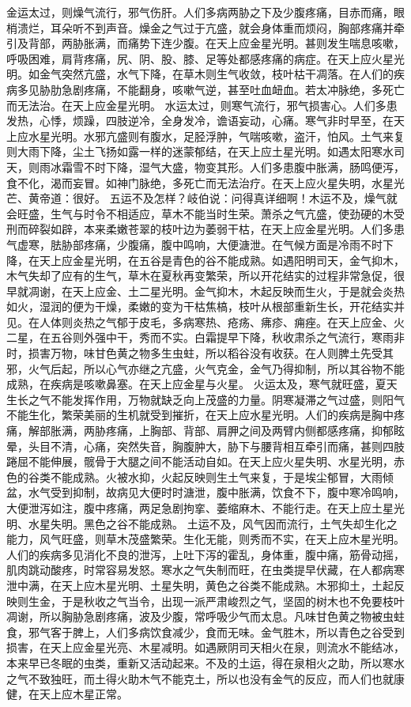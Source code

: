 \documentclass[a4paper,12pt,UTF8,twoside]{ctexbook}
\begin{document}
金运太过，则燥气流行，邪气伤肝。人们多病两胁之下及少腹疼痛，目赤而痛，眼梢溃烂，耳朵听不到声音。燥金之气过于亢盛，就会身体重而烦闷，胸部疼痛并牵引及背部，两胁胀满，而痛势下连少腹。在天上应金星光明。甚则发生喘息咳嗽，呼吸困难，肩背疼痛，尻、阴、股、膝、足等处都感疼痛的病症。在天上应火星光明。如金气突然亢盛，水气下降，在草木则生气收敛，枝叶枯干凋落。在人们的疾病多见胁肋急剧疼痛，不能翻身，咳嗽气逆，甚至吐血衄血。若太冲脉绝，多死亡而无法治。在天上应金星光明。
水运太过，则寒气流行，邪气损害心。人们多患发热，心悸，烦躁，四肢逆冷，全身发冷，谵语妄动，心痛。寒气非时早至，在天上应水星光明。水邪亢盛则有腹水，足胫浮肿，气喘咳嗽，盗汗，怕风。土气来复则大雨下降，尘土飞扬如露一样的迷蒙郁结，在天上应土星光明。如遇太阳寒水司天，则雨冰霜雪不时下降，湿气大盛，物变其形。人们多患腹中胀满，肠鸣便泻，食不化，渴而妄冒。如神门脉绝，多死亡而无法治疗。在天上应火星失明，水星光芒、黄帝道：很好。
五运不及怎样？岐伯说：问得真详细啊！木运不及，燥气就会旺盛，生气与时令不相适应，草木不能当时生荣。萧杀之气亢盛，使劲硬的木受刑而碎裂如辟，本来柔嫩苍翠的枝叶边为萎弱干枯，在天上应金星光明。人们多患气虚寒，胠胁部疼痛，少腹痛，腹中鸣响，大便溏泄。在气候方面是冷雨不时下降，在天上应金星光明，在五谷是青色的谷不能成熟。如遇阳明司天，金气抑木，木气失却了应有的生气，草木在夏秋再变繁荣，所以开花结实的过程非常急促，很早就凋谢，在天上应金、土二星光明。金气抑木，木起反映而生火，于是就会炎热如火，湿润的便为干燥，柔嫩的变为干枯焦槁，枝叶从根部重新生长，开花结实并见。在人体则炎热之气郁于皮毛，多病寒热、疮疡、疿疹、痈痤。在天上应金、火二星，在五谷则外强中干，秀而不实。白霜提早下降，秋收肃杀之气流行，寒雨非时，损害万物，味甘色黄之物多生虫蛀，所以稻谷没有收获。在人则脾土先受其邪，火气后起，所以心气亦继之亢盛，火气克金，金气乃得抑制，所以其谷物不能成熟，在疾病是咳嗽鼻塞。在天上应金星与火星。
火运太及，寒气就旺盛，夏天生长之气不能发挥作用，万物就缺乏向上茂盛的力量。阴寒凝滞之气过盛，则阳气不能生化，繁荣美丽的生机就受到摧折，在天上应水星光明。人们的疾病是胸中疼痛，解部胀满，两胁疼痛，上胸部、背部、肩胛之间及两臂内侧都感疼痛，抑郁眩晕，头目不清，心痛，突然失音，胸腹肿大，胁下与腰背相互牵引而痛，甚则四肢踡屈不能伸展，髋骨于大腿之间不能活动自如。在天上应火星失明、水星光明，赤色的谷类不能成熟。火被水抑，火起反映则生土气来复，于是埃尘郁冒，大雨倾盆，水气受到抑制，故病见大便时时溏泄，腹中胀满，饮食不下，腹中寒冷鸣响，大便泄泻如注，腹中疼痛，两足急剧拘挛、萎缩麻木、不能行走。在天上应土星光明、水星失明。黑色之谷不能成熟。
土运不及，风气因而流行，土气失却生化之能力，风气旺盛，则草木茂盛繁荣。生化无能，则秀而不实，在天上应木星光明。人们的疾病多见消化不良的泄泻，上吐下泻的霍乱，身体重，腹中痛，筋骨动摇，肌肉跳动酸疼，时常容易发怒。寒水之气失制而旺，在虫类提早伏藏，在人都病寒泄中满，在天上应木星光明、土星失明，黄色之谷类不能成熟。木邪抑土，土起反映则生金，于是秋收之气当令，出现一派严肃峻烈之气，坚固的树木也不免要枝叶凋谢，所以胸胁急剧疼痛，波及少腹，常呼吸少气而太息。凡味甘色黄之物被虫蛀食，邪气客于脾上，人们多病饮食减少，食而无味。金气胜木，所以青色之谷受到损害，在天上应金星光亮、木星减明。如遇厥阴司天相火在泉，则流水不能结冰，本来早已冬眠的虫类，重新又活动起来。不及的土运，得在泉相火之助，所以寒水之气不致独旺，而土得火助木气不能克土，所以也没有金气的反应，而人们也就康健，在天上应木星正常。
\end{document}
